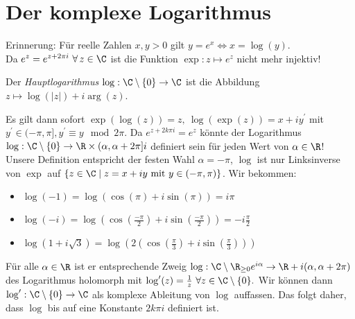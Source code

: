 \section{Der komplexe Logarithmus}\lecture
		
		Erinnerung: Für reelle Zahlen $ x,y > 0 $ gilt $ y = e^x \iff x = \log(y) $.\\
		Da $ e^z = e^{z+2\pi i} \ \forall\, z \in \C $ ist die Funktion $ \exp: z \mapsto e^z $ nicht mehr injektiv!
		
		\begin{defn}
			Der \emph{Hauptlogarithmus} $ \log: \C \setminus \{0\} \to \C $ ist die Abbildung $ z \mapsto \log(|z|) + i \arg(z) $.
		\end{defn}
		
		Es gilt dann sofort $ \exp(\log(z)) = z,\ \log(\exp(z)) = x+iy^\prime $ mit $ y^\prime \in (-\pi,\pi], y^\prime \equiv y \mod 2\pi. $ Da $ e^{z+2k\pi i} = e^z $ könnte der Logarithmus $ \log: \C \setminus\{0\} \to \R \times (\alpha,\alpha + 2 \pi] i $ definiert sein für jeden Wert von $ \alpha \in \R $! Unsere Definition entspricht der festen Wahl $ \alpha = -\pi $, $\log$ ist nur Linksinverse von $\exp$ auf $ \{ z \in \C \mid z=x+iy\ \text{mit } y \in (-\pi,\pi) \} $. Wir bekommen:
		\begin{itemize}
			\item $ \log(-1) = \log(\cos(\pi) + i\sin(\pi)) = i\pi $
			\item $ \log(-i) = \log\left( \cos \left( \frac{-\pi}{2} \right) + i \sin \left( \frac{-\pi}{2} \right) \right) = -i \frac{\pi}{2} $
			\item $ \log(1+i\sqrt{3}) = \log\left(2\left(\cos \left( \frac{\pi}{3} \right) + i \sin \left( \frac{\pi}{3} \right)\right)\right) $
		\end{itemize}
		
		\begin{thm}\label{thm_logdiff}
			Für alle $ \alpha \in \R $ ist er entsprechende Zweig $ \log: \C \setminus \R_{\geq 0} e^{i\alpha} \to \R + i(\alpha,\alpha + 2\pi) $ des Logarithmus holomorph mit $ \log^\prime(z) = \frac{1}{z}\ \forall z \in \C \setminus \{0\}. $ Wir können dann $ \log^\prime: \C\setminus\{0\} \to \C $ als komplexe Ableitung von $\log$ auffassen. Das folgt daher, dass $\log$ bis auf eine Konstante $ 2k\pi i $ definiert ist.
		\end{thm}
		
